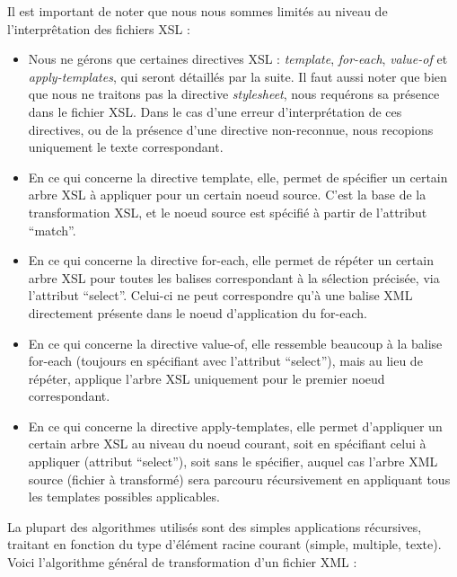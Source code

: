 \documentclass[10pt, a4paper]{article}
\begin{document}
Il est important de noter que nous nous sommes limités au niveau de
l'interprêtation des fichiers XSL :

\begin{itemize}
\itemsep1pt\parskip0pt
\item
  Nous ne gérons que certaines directives XSL : \emph{template},
  \emph{for-each}, \emph{value-of} et \emph{apply-templates}, qui seront
  détaillés par la suite. Il faut aussi noter que bien que nous ne
  traitons pas la directive \emph{stylesheet}, nous requérons sa
  présence dans le fichier XSL. Dans le cas d'une erreur
  d'interprétation de ces directives, ou de la présence d'une directive
  non-reconnue, nous recopions uniquement le texte correspondant.
\item
  En ce qui concerne la directive template, elle, permet de spécifier un
  certain arbre XSL à appliquer pour un certain noeud source. C'est la
  base de la transformation XSL, et le noeud source est spécifié à
  partir de l'attribut ``match''.
\item
  En ce qui concerne la directive for-each, elle permet de répéter un
  certain arbre XSL pour toutes les balises correspondant à la sélection
  précisée, via l'attribut ``select''. Celui-ci ne peut correspondre
  qu'à une balise XML directement présente dans le noeud d'application
  du for-each.
\item
  En ce qui concerne la directive value-of, elle ressemble beaucoup à la
  balise for-each (toujours en spécifiant avec l'attribut ``select''),
  mais au lieu de répéter, applique l'arbre XSL uniquement pour le
  premier noeud correspondant.
\item
  En ce qui concerne la directive apply-templates, elle permet
  d'appliquer un certain arbre XSL au niveau du noeud courant, soit en
  spécifiant celui à appliquer (attribut ``select''), soit sans le
  spécifier, auquel cas l'arbre XML source (fichier à transformé) sera
  parcouru récursivement en appliquant tous les templates possibles
  applicables.
\end{itemize}

La plupart des algorithmes utilisés sont des simples applications
récursives, traitant en fonction du type d'élément racine courant
(simple, multiple, texte). \\

Voici l'algorithme général de transformation d'un fichier XML :
\end{document}

